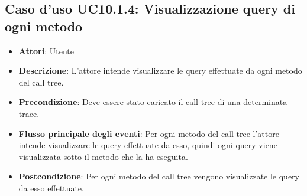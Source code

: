 \subsection{Caso d'uso UC10.1.4: Visualizzazione query di ogni metodo}
\begin{itemize}
	\item \textbf{Attori}: Utente
	\item \textbf{Descrizione}: L'attore intende visualizzare le query effettuate da ogni metodo del call tree.
	\item \textbf{Precondizione}: Deve essere stato caricato il call tree di una determinata trace.
	\item \textbf{Flusso principale degli eventi}: Per ogni metodo del call tree l'attore intende visualizzare le query effettuate da esso, quindi ogni query viene visualizzata sotto il metodo che la ha eseguita.
	\item \textbf{Postcondizione}: Per ogni metodo del call tree vengono visualizzate le query da esso effettuate.
\end{itemize}

